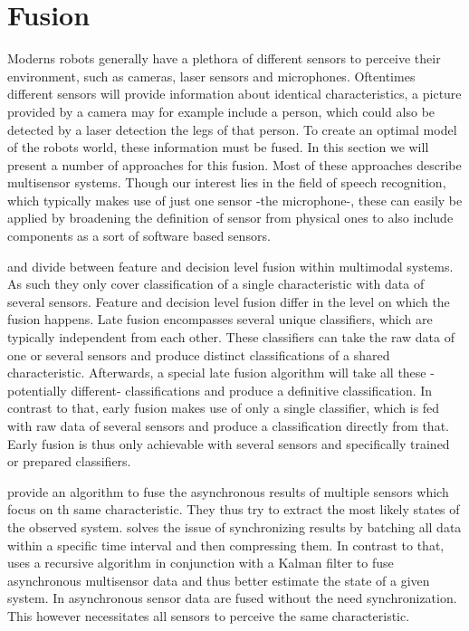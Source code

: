 
\section{Fusion}
\label{related:fusion}
Moderns robots generally have a plethora of different sensors to perceive their environment, such as cameras, laser sensors and microphones.
Oftentimes different sensors will provide information about identical characteristics, a picture provided by a camera may for example include a person, which could also be detected by a laser detection the legs of that person.
To create an optimal model of the robots world, these information must be fused.
In this section we will present a number of approaches for this fusion.
Most of these approaches describe multisensor systems.
Though our interest lies in the field of speech recognition, which typically makes use of just one sensor -the microphone-, these can easily be applied by broadening the definition of sensor from physical ones to also include components as a sort of software based sensors.

\cite{TURK2014189} and \cite{PORIA201650} divide between feature and decision level fusion within multimodal systems.
As such they only cover classification of a single characteristic with data of several sensors.
Feature and decision level fusion differ in the level on which the fusion happens.
Late fusion encompasses several unique classifiers, which are typically independent from each other. 
These classifiers can take the raw data of one or several sensors and produce distinct classifications of a shared characteristic.
Afterwards, a special late fusion algorithm will take all these -potentially different- classifications and produce a definitive classification.
In contrast to that, early fusion makes use of only a single classifier, which is fed with raw data of several sensors and produce a classification directly from that.
Early fusion is thus only achievable with several sensors and specifically trained or prepared classifiers.

\cite{287895} provide an algorithm to fuse the asynchronous results of multiple sensors which focus on th same characteristic.
They thus try to extract the most likely states of the observed system.
\cite{10.1117/12.138164} solves the issue of synchronizing results by batching all data within a specific time interval and then compressing them. 
In contrast to that, \cite{4383603} uses a recursive algorithm in conjunction with a Kalman filter to fuse asynchronous multisensor data and thus better estimate the state of a given system.
In \cite{1468761} asynchronous sensor data are fused without the need synchronization.
This however necessitates all sensors to perceive the same characteristic.